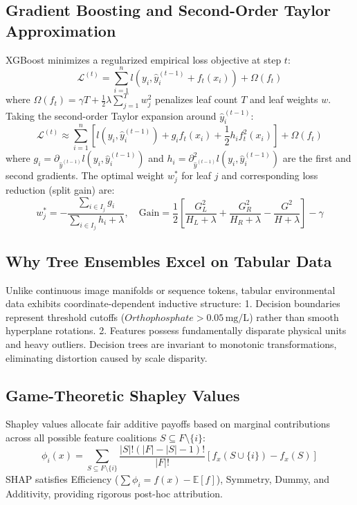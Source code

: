 \documentclass[journal,10pt,twocolumn]{IEEEtran}
\begin{document}
\subsection{Gradient Boosting and Second-Order Taylor Approximation}
XGBoost minimizes a regularized empirical loss objective at step $t$:
\begin{equation}
    \mathcal{L}^{(t)} = \sum_{i=1}^n l(y_i, \hat{y}_i^{(t-1)} + f_t(x_i)) + \Omega(f_t)
\end{equation}
where $\Omega(f_t) = \gamma T + \frac{1}{2}\lambda \sum_{j=1}^T w_j^2$ penalizes leaf count $T$ and leaf weights $w$. Taking the second-order Taylor expansion around $\hat{y}_i^{(t-1)}$:
\begin{equation}
    \mathcal{L}^{(t)} \approx \sum_{i=1}^n \left[ l(y_i, \hat{y}_i^{(t-1)}) + g_i f_t(x_i) + \frac{1}{2} h_i f_t^2(x_i) \right] + \Omega(f_t)
\end{equation}
where $g_i = \partial_{\hat{y}^{(t-1)}} l(y_i, \hat{y}_i^{(t-1)})$ and $h_i = \partial^2_{\hat{y}^{(t-1)}} l(y_i, \hat{y}_i^{(t-1)})$ are the first and second gradients. The optimal weight $w_j^*$ for leaf $j$ and corresponding loss reduction (split gain) are:
\begin{equation}
    w_j^* = -\frac{\sum_{i \in I_j} g_i}{\sum_{i \in I_j} h_i + \lambda}, \quad \text{Gain} = \frac{1}{2}\left[ \frac{G_L^2}{H_L + \lambda} + \frac{G_R^2}{H_R + \lambda} - \frac{G^2}{H + \lambda} \right] - \gamma
\end{equation}

\subsection{Why Tree Ensembles Excel on Tabular Data}
Unlike continuous image manifolds or sequence tokens, tabular environmental data exhibits coordinate-dependent inductive structure:
1. Decision boundaries represent threshold cutoffs ($Orthophosphate > 0.05\,\text{mg/L}$) rather than smooth hyperplane rotations.
2. Features possess fundamentally disparate physical units and heavy outliers. Decision trees are invariant to monotonic transformations, eliminating distortion caused by scale disparity.

\subsection{Game-Theoretic Shapley Values}
Shapley values allocate fair additive payoffs based on marginal contributions across all possible feature coalitions $S \subseteq F \setminus \{i\}$:
\begin{equation}
    \phi_i(x) = \sum_{S \subseteq F \setminus \{i\}} \frac{|S|!(|F| - |S| - 1)!}{|F|!} [f_x(S \cup \{i\}) - f_x(S)]
\end{equation}
SHAP satisfies Efficiency ($\sum \phi_i = f(x) - \mathbb{E}[f]$), Symmetry, Dummy, and Additivity, providing rigorous post-hoc attribution.
\end{document}
